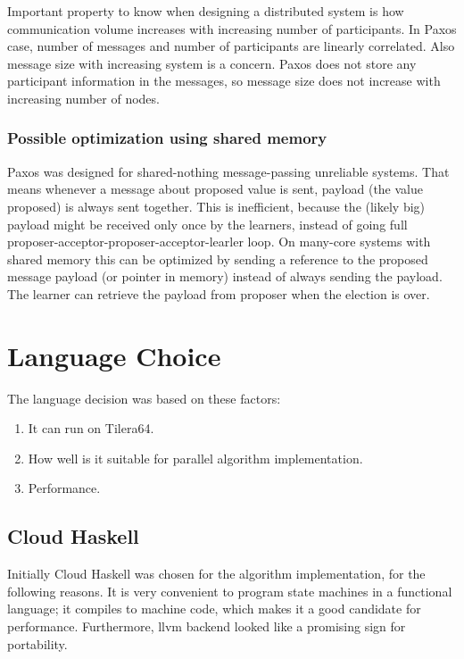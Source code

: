\documentclass[english,11pt]{l4proj}
\begin{document}
Important property to know when designing a distributed system is how
communication volume increases with increasing number of participants. In Paxos
case, number of messages and number of participants are linearly correlated.
Also message size with increasing system is a concern. Paxos does not store any
participant information in the messages, so message size does not increase
with increasing number of nodes.

\subsubsection{Possible optimization using shared memory}

Paxos was designed for shared-nothing message-passing unreliable systems. That
means whenever a message about proposed value is sent, payload (the value
proposed) is always sent together. This is inefficient, because the (likely big)
payload might be received only once by the learners, instead of going full
proposer-acceptor-proposer-acceptor-learler loop. On many-core systems with
shared memory this can be optimized by sending a reference to the proposed
message payload (or pointer in memory) instead of always sending the payload.
The learner can retrieve the payload from proposer when the election is over.

\section{Language Choice}
\label{sec:erlang-why}

The language decision was based on these factors:
\begin{enumerate}
    \item It can run on Tilera64.
    \item How well is it suitable for parallel algorithm implementation.
    \item Performance.
\end{enumerate}

\subsection{Cloud Haskell}

Initially Cloud Haskell\cite{cloud-haskell}  was chosen for the algorithm
implementation, for the following reasons. It is very convenient to program
state machines in a functional language; it compiles to machine code, which
makes it a good candidate for performance. Furthermore, llvm
backend\cite{llvm-haskell} looked like a promising sign for portability.
\end{document}
